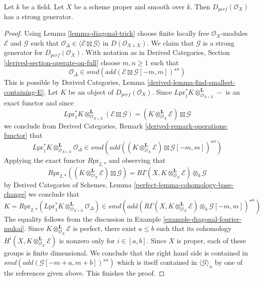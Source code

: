 \begin{lemma}
\label{lemma-smooth-proper-strong-generator}
Let $k$ be a field. Let $X$ be a scheme proper and smooth over $k$.
Then $D_{perf}(\mathcal{O}_X)$
has a strong generator.
\end{lemma}

\begin{proof}
Using Lemma \ref{lemma-diagonal-trick} choose finite locally free
$\mathcal{O}_X$-modules $\mathcal{E}$ and $\mathcal{G}$ such that
$\mathcal{O}_\Delta \in \langle \mathcal{E} \boxtimes \mathcal{G} \rangle$
in $D(\mathcal{O}_{X \times X})$. We claim that $\mathcal{G}$
is a strong generator for $D_{perf}(\mathcal{O}_X)$. With notation as in
Derived Categories, Section \ref{derived-section-operate-on-full}
choose $m, n \geq 1$ such that
$$
\mathcal{O}_\Delta \in
smd(add(\mathcal{E} \boxtimes \mathcal{G}[-m, m])^{\star n})
$$
This is possible by Derived Categories, Lemma
\ref{derived-lemma-find-smallest-containing-E}.
Let $K$ be an object of $D_{perf}(\mathcal{O}_X)$. Since
$L\text{pr}_1^*K \otimes_{\mathcal{O}_{X \times X}}^\mathbf{L} -$
is an exact functor and since
$$
L\text{pr}_1^*K \otimes_{\mathcal{O}_{X \times X}}^\mathbf{L}
(\mathcal{E} \boxtimes \mathcal{G}) =
(K \otimes_{\mathcal{O}_X}^\mathbf{L} \mathcal{E}) \boxtimes \mathcal{G}
$$
we conclude from
Derived Categories, Remark \ref{derived-remark-operations-functor} that
$$
L\text{pr}_1^*K
\otimes_{\mathcal{O}_{X \times X}}^\mathbf{L}
\mathcal{O}_\Delta
\in
smd(add(
(K \otimes_{\mathcal{O}_X}^\mathbf{L} \mathcal{E})
\boxtimes \mathcal{G}[-m, m])^{\star n})
$$
Applying the exact functor $R\text{pr}_{2, *}$ and observing that
$$
R\text{pr}_{2, *}
\left((K \otimes_{\mathcal{O}_X}^\mathbf{L} \mathcal{E}) \boxtimes
\mathcal{G}\right) =
R\Gamma(X, K \otimes_{\mathcal{O}_X}^\mathbf{L} \mathcal{E})
\otimes_k \mathcal{G}
$$
by Derived Categories of Schemes, Lemma
\ref{perfect-lemma-cohomology-base-change} we conclude that
$$
K = R\text{pr}_{2, *}(L\text{pr}_1^*K
\otimes_{\mathcal{O}_{X \times X}}^\mathbf{L} \mathcal{O}_\Delta)
\in
smd(add(R\Gamma(X, K \otimes_{\mathcal{O}_X}^\mathbf{L} \mathcal{E})
\otimes_k \mathcal{G}[-m, m])^{\star n})
$$
The equality follows from the discussion in
Example \ref{example-diagonal-fourier-mukai}.
Since $K \otimes_{\mathcal{O}_X}^\mathbf{L} \mathcal{E}$ is perfect,
there exist $a \leq b$ such that its cohomology
$H^i(X, K \otimes_{\mathcal{O}_X}^\mathbf{L} \mathcal{E})$ is nonzero
only for $i \in [a, b]$. Since $X$ is proper, each of these groups
is finite dimensional. We conclude that
the right hand side is contained in
$smd(add(\mathcal{G}[-m + a, m + b])^{\star n})$ which is
itself contained in $\langle \mathcal{G} \rangle_n$ by one of the
references given above. This finishes the proof.
\end{proof}

